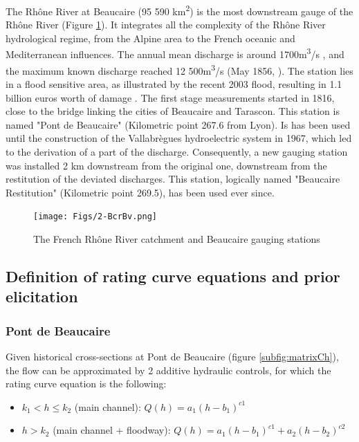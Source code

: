 \documentclass[11pt]{article}
\begin{document}
    The Rhône River at Beaucaire (95 590 km\textsuperscript{2}) is the most downstream gauge of the Rhône River (Figure \ref{fig:locstations}). It integrates all the complexity of the Rhône River hydrological regime, from the Alpine area to the French oceanic and Mediterranean influences. The annual mean discharge is around 1700m\textsuperscript{3}/s \citep{bard_actualisation_2018}, and the maximum known discharge reached 12 500m\textsuperscript{3}/s (May 1856, \citet{lang_les_2014}). The station lies in a flood sensitive area, as illustrated by the recent 2003 flood, resulting in 1.1 billion euros worth of damage \citep{lang_les_2014}. 
    The first stage measurements started in 1816, close to the bridge linking the cities of Beaucaire and Tarascon. This station is named "Pont de Beaucaire" (Kilometric point 267.6 from Lyon). Is has been used until the construction of the Vallabrègues hydroelectric system in 1967, which led to the derivation of a part of the discharge. Consequently, a new gauging station was installed 2 km downstream from the original one, downstream from the restitution of the deviated discharges. This station, logically named "Beaucaire Restitution" (Kilometric point 269.5), has been used ever since.

    \begin{figure}[h]
        \centering
        \texttt{[image: Figs/2-BcrBv.png]}
        \caption{The French Rhône River catchment and Beaucaire gauging stations}
        \label{fig:locstations}
    \end{figure}
    

        \subsection{Definition of rating curve equations and prior elicitation}
        \label{sec:prior_elicitation}
        \subsubsection{Pont de Beaucaire}
        
        Given historical cross-sections at Pont de Beaucaire (figure \ref{subfig:matrixCh}), the flow can be approximated by 2 additive hydraulic controls, for which the rating curve equation is the following:
        
        \begin{itemize}
            \item $k_1 < h \leq k_2 $ (main channel): $Q(h) = a_1(h-b_1)^{c1}$
            \item $h > k_2$ (main channel + floodway):  $Q(h) = a_1(h-b_1)^{c1}+ a_2(h-b_2)^{c2}$
        \end{itemize}
        
\end{document}
